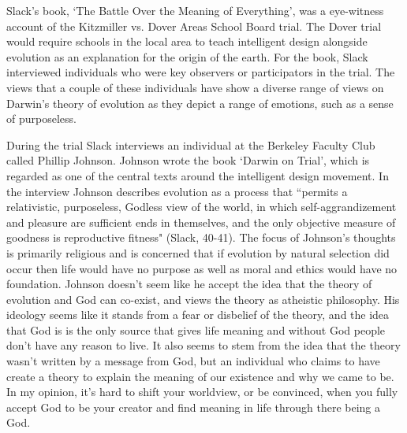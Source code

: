 \documentclass[11pt, oneside]{article}
\begin{document}


\par Slack's book, `The Battle Over the Meaning of Everything', was a eye-witness account of the Kitzmiller vs. Dover Areas School Board trial. The Dover trial would require schools in the local area to teach intelligent design alongside evolution as an explanation for the origin of the earth. For the book, Slack interviewed individuals who were key observers or participators in the trial. The views that a couple of these individuals have show a diverse range of views on Darwin's theory of evolution as they depict a range of emotions, such as a sense of purposeless. 

\par During the trial Slack interviews an individual at the Berkeley Faculty Club called Phillip Johnson. Johnson wrote the book `Darwin on Trial', which is regarded as one of the central texts around the intelligent design movement. In the interview Johnson describes evolution as a process that ``permits a relativistic, purposeless, Godless view of the world, in which self-aggrandizement and pleasure are sufficient ends in themselves, and the only objective measure of goodness is reproductive fitness" (Slack, 40-41). The focus of Johnson's thoughts is primarily religious and is concerned that if evolution by natural selection did occur then life would have no purpose as well as moral and ethics would have no foundation. Johnson doesn't seem like he accept the idea that the theory of evolution and God can co-exist, and views the theory as atheistic philosophy. His ideology seems like it stands from a fear or disbelief of the theory, and the idea that God is is the only source that gives life meaning and without God people don't have any reason to live. It also seems to stem from the idea that the theory wasn't written by a message from God, but an individual who claims to have create a theory to explain the meaning of our existence and why we came to be. In my opinion, it's hard to shift your worldview, or be convinced, when you fully accept God to be your creator and find meaning in life through there being a God.
\end{document}
